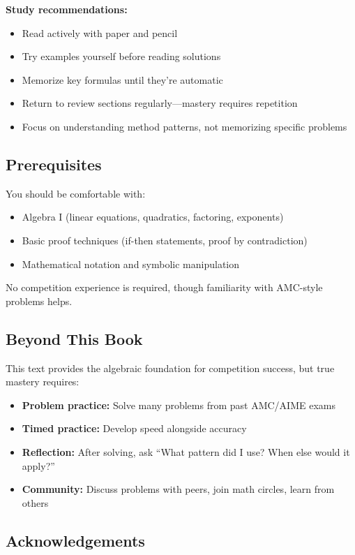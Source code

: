 \documentclass[12pt]{extarticle}
\begin{document}
\textbf{Study recommendations:}
\begin{itemize}
    \item Read actively with paper and pencil
    \item Try examples yourself before reading solutions
    \item Memorize key formulas until they're automatic
    \item Return to review sections regularly—mastery requires repetition
    \item Focus on understanding method patterns, not memorizing specific problems
\end{itemize}

\subsection*{Prerequisites}

You should be comfortable with:
\begin{itemize}
    \item Algebra I (linear equations, quadratics, factoring, exponents)
    \item Basic proof techniques (if-then statements, proof by contradiction)
    \item Mathematical notation and symbolic manipulation
\end{itemize}

No competition experience is required, though familiarity with AMC-style problems helps.

\subsection*{Beyond This Book}

This text provides the algebraic foundation for competition success, but true mastery requires:
\begin{itemize}
    \item \textbf{Problem practice:} Solve many problems from past AMC/AIME exams
    \item \textbf{Timed practice:} Develop speed alongside accuracy
    \item \textbf{Reflection:} After solving, ask ``What pattern did I use? When else would it apply?''
    \item \textbf{Community:} Discuss problems with peers, join math circles, learn from others
\end{itemize}

\subsection*{Acknowledgements}
\end{document}
